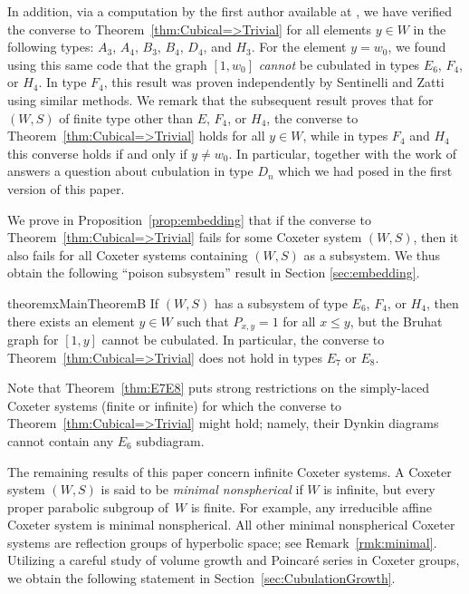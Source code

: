 \documentclass[11pt]{amsart}
\theoremstyle{plain}
\newtheorem{thm}{Theorem}[section]
\theoremstyle{definition}
\numberwithin{equation}{subsection}
\begin{document}
In addition, via a computation by the first author available at \cite{code}, we have verified the converse to Theorem~\ref{thm:Cubical=>Trivial} for all elements $y \in W$ in the following types: $A_3$, $A_4$, $B_3$, $B_4$, $D_4$, and $H_3$.
For the element $y = w_0$, we found using this same code that the graph $[1,w_0]$  \emph{cannot} be cubulated in types $E_6$, $F_4$, or $H_4$. In type $F_4$, this result was proven independently by Sentinelli and Zatti~\cite{SentinelliZatti} using similar methods.
We remark that the subsequent result \cite[Theorem 1.8]{GaetzGao} proves that for $(W,S)$ of finite type other than $E$, $F_4$,  or $H_4$, the converse to Theorem~\ref{thm:Cubical=>Trivial} holds for all $y \in W$, while in types $F_4$ and $H_4$ this converse holds if and only if $y \neq w_0$. In particular, \cite[Theorem 1.8]{GaetzGao} together with the work of \cite{Bolognini2025} answers a question about cubulation in type $D_n$ which we had posed in the first version of this paper.

We prove in Proposition~\ref{prop:embedding} that if the converse to Theorem~\ref{thm:Cubical=>Trivial} fails for some Coxeter system $(W,S)$, then it also fails for all Coxeter systems containing $(W,S)$ as a subsystem. We thus obtain the following ``poison subsystem'' result in Section \ref{sec:embedding}.

\begin{restatable*}{theoremx}{MainTheoremB}\label{thm:E7E8}
If $(W,S)$ has a subsystem of type $E_6$, $F_4$, or $H_4$, then there exists an element $y \in W$ such that $P_{x,y}=1$ for all $x \leq y$, but the Bruhat graph for $[1,y]$ cannot be cubulated. In particular, the converse to Theorem~\ref{thm:Cubical=>Trivial} does not hold in types $E_7$ or $E_8$.
\end{restatable*}

Note that Theorem~\ref{thm:E7E8} puts strong restrictions on the simply-laced Coxeter systems (finite or infinite) for which the converse to Theorem~\ref{thm:Cubical=>Trivial} might hold; namely, their Dynkin diagrams cannot contain any $E_6$ subdiagram. 

The remaining results of this paper concern infinite Coxeter systems. 
A Coxeter system $(W,S)$ is said to be \emph{minimal nonspherical} if $W$ is infinite, but every proper parabolic subgroup of~$W$ is finite. For example, any irreducible affine Coxeter system is minimal nonspherical. All other minimal nonspherical Coxeter systems are reflection groups of hyperbolic space; see Remark~\ref{rmk:minimal}. Utilizing a careful study of volume growth and Poincar\'e series in Coxeter groups, we obtain the following statement in Section~\ref{sec:CubulationGrowth}.
\end{document}
